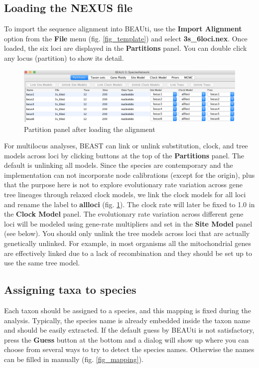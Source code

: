 \documentclass[11pt]{article}
\begin{document}
\subsection*{Loading the NEXUS file}

To import the sequence alignment into BEAUti, use the \textbf{Import Alignment} option from the \textbf{File} menu (fig. \ref{fig_template}) and select \textbf{3s\_6loci.nex}. Once loaded, the six loci are displayed in the \textbf{Partitions} panel. You can double click any locus (partition) to show its detail.

\begin{figure}[h]
\center
\includegraphics[width=1.0\textwidth]{figs/fig3_partition}
\caption{Partition panel after loading the alignment}
\label{fig_partition}
\end{figure}

For multilocus analyses, BEAST can link or unlink substitution, clock, and tree models across loci by clicking buttons at the top of the \textbf{Partitions} panel. The default is unlinking all models.
Since the species are contemporary and the implementation can not incorporate node calibrations (except for the origin), plus that the purpose here is not to explore evolutionary rate variation across gene tree lineages through relaxed clock models, we link the clock models for all loci and rename the label to \textbf{allloci} (fig. \ref{fig_partition}). The clock rate will later be fixed to 1.0 in the \textbf{Clock Model} panel. The evolutionary rate variation across different gene loci will be modeled using gene-rate multipliers and set in the \textbf{Site Model} panel (see below).
You should only unlink the tree models across loci that are actually genetically unlinked. For example, in most organisms all the mitochondrial genes are effectively linked due to a lack of recombination and they should be set up to use the same tree model.

\subsection*{Assigning taxa to species}
Each taxon should be assigned to a species, and this mapping is fixed during the analysis. Typically, the species name is already embedded inside the taxon name and should be easily extracted. If the default guess by BEAUti is not satisfactory, press the \textbf{Guess} button at the bottom and a dialog will show up where you can choose from several ways to try to detect the species names. Otherwise the names can be filled in manually (fig. \ref{fig_mapping}).
\end{document}
